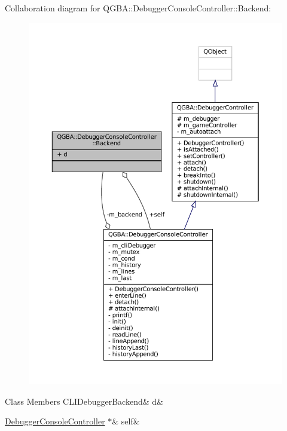 Collaboration diagram for Q\+G\+BA\+:\+:Debugger\+Console\+Controller\+:\+:Backend\+:
\nopagebreak
\begin{figure}[H]
\begin{center}
\leavevmode
\includegraphics[width=350pt]{struct_q_g_b_a_1_1_debugger_console_controller_1_1_backend__coll__graph}
\end{center}
\end{figure}
\begin{DoxyFields}{Class Members}
\mbox{\label{class_q_g_b_a_1_1_debugger_console_controller_a8e6029b8f27ba551e3115f9ea344d04b}} 
CLIDebuggerBackend&
d&
\\
\hline

\mbox{\label{class_q_g_b_a_1_1_debugger_console_controller_ae641832c95bf2bf3885aea397cbe0a6c}} 
\mbox{\hyperlink{class_q_g_b_a_1_1_debugger_console_controller}{DebuggerConsoleController}} $\ast$&
self&
\\
\hline

\end{DoxyFields}


